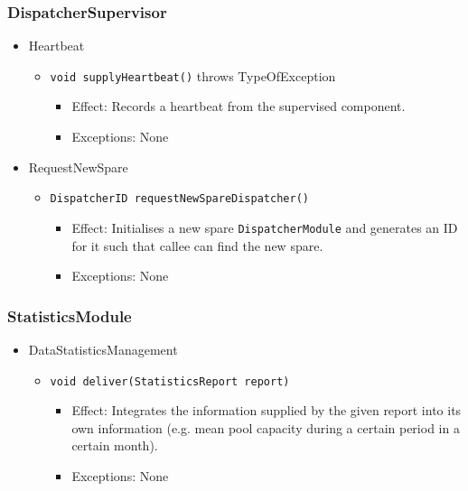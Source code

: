 \documentclass[a4paper,10pt]{article}
\begin{document}
\subsubsection*{DispatcherSupervisor}
\begin{itemize}
	\item Heartbeat
	\begin{itemize}
		\item \texttt{void supplyHeartbeat()} throws TypeOfException
		\begin{itemize}
			\item Effect: Records a heartbeat from the supervised component.
			\item Exceptions: None
		\end{itemize}
	\end{itemize}
\end{itemize}

\begin{itemize}
	\item RequestNewSpare
	\begin{itemize}
		\item \texttt{DispatcherID requestNewSpareDispatcher()}
		\begin{itemize}
			\item Effect: Initialises a new spare \texttt{DispatcherModule} and generates an ID for it such that callee can find the new spare.
			\item Exceptions: None
		\end{itemize}
	\end{itemize}
\end{itemize}

\subsubsection*{StatisticsModule}
\begin{itemize}
	\item DataStatisticsManagement
	\begin{itemize}
		\item \texttt{void deliver(StatisticsReport report)}
		\begin{itemize}
			\item Effect: Integrates the information supplied by the given report into its own information (e.g. mean pool capacity during a certain period in a certain month).
			\item Exceptions: None
		\end{itemize}
	\end{itemize}
\end{itemize}
\end{document}
